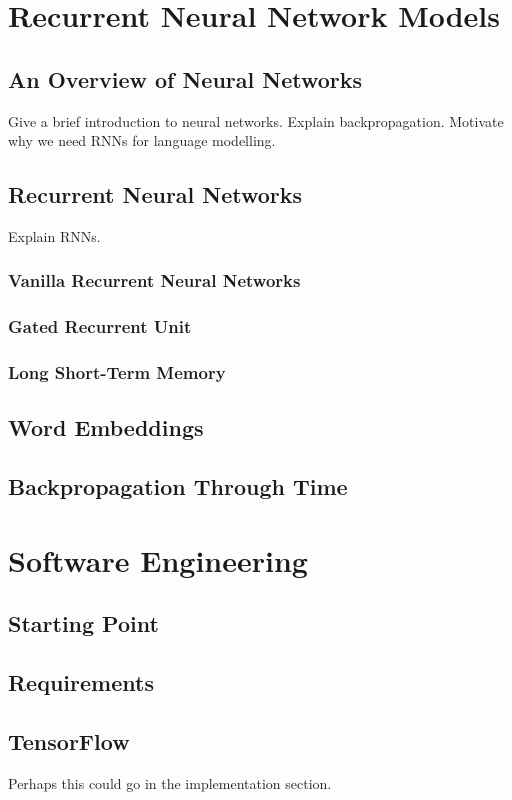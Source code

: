 \documentclass[a4paper, 12pt]{report}
\begin{document}
\section{Recurrent Neural Network Models}
\subsection{An Overview of Neural Networks}
Give a brief introduction to neural networks. Explain backpropagation. Motivate why we need RNNs for language modelling.
\subsection{Recurrent Neural Networks}
Explain RNNs.
\subsubsection{Vanilla Recurrent Neural Networks}
\subsubsection{Gated Recurrent Unit}
\subsubsection{Long Short-Term Memory}
\subsection{Word Embeddings}
\subsection{Backpropagation Through Time}
\section{Software Engineering}
\subsection{Starting Point}
\subsection{Requirements}
\subsection{TensorFlow}
Perhaps this could go in the implementation section.
\end{document}
